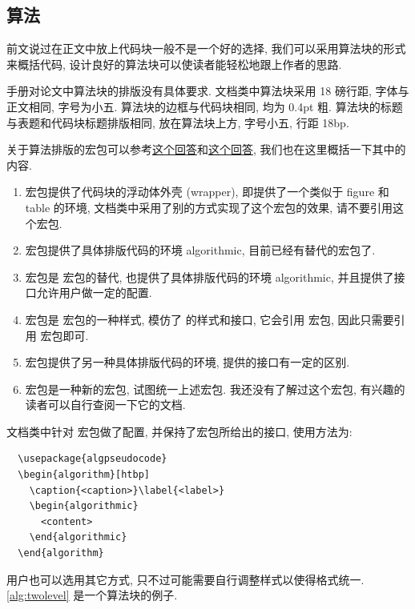 \subsection{算法}

前文说过在正文中放上代码块一般不是一个好的选择, 我们可以采用算法块的形式来概括代码, 设计良好的算法块可以使读者能轻松地跟上作者的思路.

手册对论文中算法块的排版没有具体要求. 文档类中算法块采用 18 磅行距, 字体与正文相同, 字号为小五. 算法块的边框与代码块相同, 均为 0.4pt 粗. 算法块的标题与表题和代码块标题排版相同, 放在算法块上方, 字号小五, 行距 18bp.

关于算法排版的宏包可以参考\href{https://tex.stackexchange.com/a/230789/}{这个回答}和\href{https://tex.stackexchange.com/a/594570/}{这个回答}, 我们也在这里概括一下其中的内容.
\begin{enumerate}
  \item {} 宏包提供了代码块的浮动体外壳 (wrapper), 即提供了一个类似于 figure 和 table 的环境, 文档类中采用了别的方式实现了这个宏包的效果, 请不要引用这个宏包.
  \item {} 宏包提供了具体排版代码的环境 algorithmic, 目前已经有替代的宏包了.
  \item {} 宏包是  宏包的替代, 也提供了具体排版代码的环境 algorithmic, 并且提供了接口允许用户做一定的配置.
  \item {} 宏包是  宏包的一种样式, 模仿了  的样式和接口, 它会引用  宏包, 因此只需要引用  宏包即可.
  \item {} 宏包提供了另一种具体排版代码的环境, 提供的接口有一定的区别.
  \item {} 宏包是一种新的宏包, 试图统一上述宏包. 我还没有了解过这个宏包, 有兴趣的读者可以自行查阅一下它的文档.
\end{enumerate}

文档类中针对  宏包做了配置, 并保持了宏包所给出的接口, 使用方法为:
\begin{verbatim}
  \usepackage{algpseudocode}
  \begin{algorithm}[htbp]
    \caption{<caption>}\label{<label>}
    \begin{algorithmic}
      <content>
    \end{algorithmic}
  \end{algorithm}
\end{verbatim}
用户也可以选用其它方式, 只不过可能需要自行调整样式以使得格式统一. \ref{alg:twolevel} 是一个算法块的例子.

